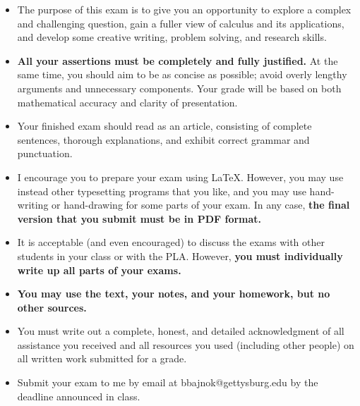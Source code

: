 \documentclass[12pt]{article}
\begin{document}
\begin{itemize}
  
\item The purpose of this exam is to give you an opportunity to explore a complex and challenging question, gain a fuller view of calculus and its applications, and develop some creative writing, problem solving, and research skills.

\item  {\bf All your assertions must be completely and fully justified.} At the same time, you should aim to be as concise as possible; avoid overly lengthy arguments and unnecessary components.  Your grade will be based on both mathematical accuracy and clarity of presentation.

\item 
Your finished exam should read as an article, consisting of complete sentences, thorough explanations, and exhibit correct grammar and punctuation.

\item I encourage you to prepare your exam using LaTeX.  However, you may use instead other typesetting programs that you like, and you may use hand-writing or hand-drawing for some parts of your exam.  In any case, {\bf the final version that you submit must be in PDF format.}  

\item It is acceptable (and even encouraged) to discuss the exams with other students in your class or with the PLA.  However,  {\bf  you must individually write up all parts of your exams.}

\item {\bf You may use the text, your notes, and your homework, but no other sources.}
 
\item You must write out a complete, honest, and detailed acknowledgment of all assistance you received and all resources you used (including other people) on all written work submitted for a grade.

\item Submit your exam to me by email at bbajnok@gettysburg.edu by the deadline announced in class.







\end{itemize}



\newpage
\end{document}
